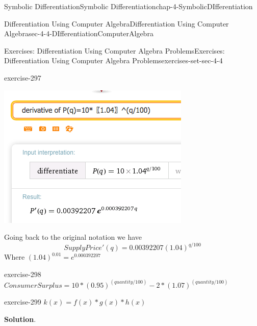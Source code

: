 \documentclass[oneside,10pt,]{book}
\numberwithin{equation}{section}
\begin{document}
\begin{chapterptx}{Symbolic Differentiation}{}{Symbolic Differentiation}{}{}{chap-4-SymbolicDIfferentiation}
\begin{sectionptx}{Differentiation Using Computer Algebra}{}{Differentiation Using Computer Algebra}{}{}{sec-4-4-DIfferentiationComputerAlgebra}
\begin{exercises-subsection-numberless}{Exercises: Differentiation Using Computer Algebra Problems}{}{Exercises: Differentiation Using Computer Algebra Problems}{}{}{exercises-set-sec-4-4}
\begin{divisionexercise}{9}{}{}{exercise-297}
\begin{sidebyside}{1}{0.25}{0.25}{0}
\begin{sbspanel}{0.5}
\includegraphics[width=1\linewidth]{images/sec4-4-sol9a.png}
\end{sbspanel}%
\end{sidebyside}%
\par
\hypertarget{p-1756}{}%
Going back to the original notation we have%
%
\begin{equation*}
SupplyPrice'(q) = 0.00392207 (1.04)^{q/100}
\end{equation*}
\hypertarget{p-1757}{}%
Where \((1.04)^{0.01}=e^{0.000392207}\)%
\end{divisionexercise}%
\begin{divisionexercise}{10}{}{}{exercise-298}%
\hypertarget{p-1758}{}%
\(ConsumerSurplus=10*(0.95)^{(quantity/100)}-2*(1.07)^{(quantity/100)}\)%
\end{divisionexercise}%
\begin{divisionexercise}{11}{}{}{exercise-299}%
\hypertarget{p-1759}{}%
\(k(x)=f(x)*g(x)*h(x)\)%
\par\smallskip%
\noindent\textbf{Solution}.\hypertarget{solution-149}{}\quad%
\leavevmode%
\begin{sidebyside}{1}{0.25}{0.25}{0}%
\begin{sbspanel}{0.5}%

\end{sbspanel}
\end{sidebyside}
\end{divisionexercise}
\end{exercises-subsection-numberless}
\end{sectionptx}
\end{chapterptx}
\end{document}
